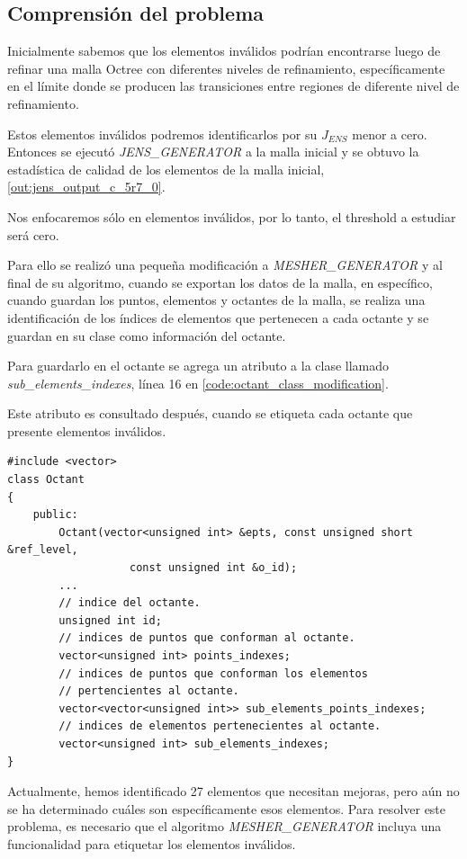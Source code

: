 
\subsection{Comprensión del problema}

Inicialmente sabemos que los elementos inválidos podrían encontrarse luego de refinar una malla Octree con diferentes niveles de refinamiento, específicamente en el límite donde se producen las transiciones entre regiones de diferente nivel de refinamiento.

Estos elementos inválidos podremos identificarlos por su $J_{ENS}$ menor a cero. Entonces se ejecutó \textit{JENS\_GENERATOR} a la malla inicial y se obtuvo la estadística de calidad de los elementos de la malla inicial, \autoref{out:jens_output_c_5r7_0}.

Nos enfocaremos sólo en elementos inválidos, por lo tanto, el threshold a estudiar será cero.

Para ello se realizó una pequeña modificación a \textit{MESHER\_GENERATOR} y al final de su algoritmo, cuando se exportan los datos de la malla, en específico, cuando guardan los puntos, elementos y octantes de la malla, se realiza una identificación de los índices de elementos que pertenecen a cada octante y se guardan en su clase como información del octante.

Para guardarlo en el octante se agrega un atributo a la clase llamado \textit{sub\_elements\_indexes}, línea 16 en \autoref{code:octant_class_modification}.

Este atributo es consultado después, cuando se etiqueta cada octante que presente elementos inválidos.

\begin{lstlisting}[style=CStyle,caption={Modificación Clase Octant.\\ Fuente: Elaboración propia.},label={code:octant_class_modification}]
#include <vector>
class Octant
{
	public:
        Octant(vector<unsigned int> &epts, const unsigned short &ref_level,
    			   const unsigned int &o_id);
        ...
        // indice del octante.
        unsigned int id;
        // indices de puntos que conforman al octante.
        vector<unsigned int> points_indexes;
        // indices de puntos que conforman los elementos 
        // pertencientes al octante.
        vector<vector<unsigned int>> sub_elements_points_indexes;
        // indices de elementos pertenecientes al octante.
        vector<unsigned int> sub_elements_indexes; 
}
\end{lstlisting}
Actualmente, hemos identificado 27 elementos que necesitan mejoras, pero aún no se ha determinado cuáles son específicamente esos elementos. Para resolver este problema, es necesario que el algoritmo \textit{MESHER\_GENERATOR} incluya una funcionalidad para etiquetar los elementos inválidos.

